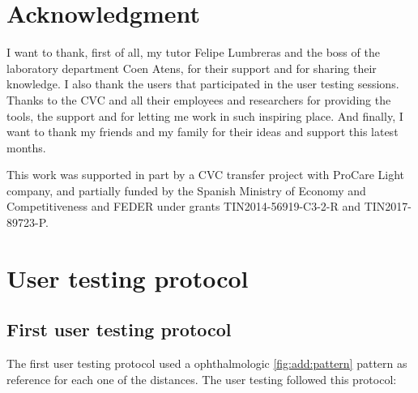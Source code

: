 \documentclass[10pt,a4paper,twocolumn,twoside]{article}
\begin{document}
	\section*{Acknowledgment}
	I want to thank, first of all, my tutor Felipe Lumbreras and the boss of the laboratory department Coen Atens, for their support and for sharing their knowledge. I also thank the users that participated in the user testing sessions. Thanks to the CVC and all their employees and researchers for providing the tools, the support and for letting me work in such inspiring place. And finally, I want to thank my friends and my family for their ideas and support this latest months. 
	
	This work was supported in part by a CVC transfer project with ProCare Light company, and partially funded by the Spanish Ministry of Economy and Competitiveness and FEDER under grants TIN2014-56919-C3-2-R and TIN2017-89723-P.
	
	
	
	
	\appendix
	
	
	\section{User testing protocol}
	\subsection{First user testing protocol}
	\label{sec:annex:user1}
	The first user testing protocol used a ophthalmologic \ref{fig:add:pattern} pattern as reference for each one of the distances. The user testing followed this protocol: 
	
\end{document}
